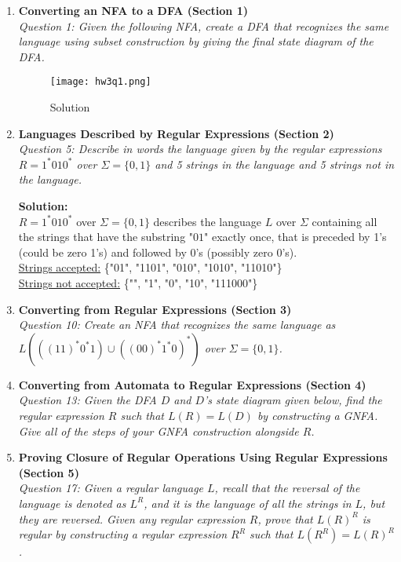 \documentclass[10pt,letterpaper,unboxed,cm]{article}
\begin{document}
\begin{enumerate}

\item \textbf{Converting an NFA to a DFA (Section 1)} \\
\emph{Question 1: Given the following NFA, create a DFA that recognizes the same language using subset construction by giving the final state diagram of the DFA.}

\begin{figure}[h]
    \centering
    \texttt{[image: hw3q1.png]}
    \caption{Solution}
    \label{fig:placeholder}
\end{figure}

\pagebreak 

\item \textbf{Languages Described by Regular Expressions (Section 2)} \\
\emph{Question 5: Describe in words the language given by the regular expressions $R=1^*010^*$ over $\Sigma = \{0,1\}$ and 5 strings in the language and 5 strings not in the language.}

\textbf{Solution:}
\\$R=1^*010^*$ over $\Sigma=\{0,1\}$ describes the language $L$ over $\Sigma$ containing all the strings that have the substring "$01$" exactly once, that is preceded by 1's (could be zero 1's) and followed by 0's (possibly zero 0's).
\\\underline{Strings accepted:} \{"01", "1101", "010", "1010", "11010"\}
\\\underline{Strings not accepted:} \{"", "1", "0", "10", "111000"\}

\pagebreak

\item \textbf{Converting from Regular Expressions (Section 3)} \\
\emph{Question 10: Create an NFA that recognizes the same language as $L(((11)^*0^*1)\cup((00)^*1^*0)^*)$ over $\Sigma=\{0,1\}$.}


\pagebreak 

\item \textbf{Converting from Automata to Regular Expressions (Section 4)} \\
\emph{Question 13: Given the DFA $D$ and $D$'s state diagram given below, find the regular expression $R$ such that $L(R)=L(D)$ by constructing a GNFA. Give all of the steps of your GNFA construction alongside $R$.}


\pagebreak

\item \textbf{Proving Closure of Regular Operations Using Regular Expressions (Section 5)} \\
\emph{Question 17: Given a regular language $L$, recall that the reversal of the language is denoted as $L^R$, and it is the language of all the strings in $L$, but they are reversed. Given any regular expression $R$, prove that $L(R)^R$ is regular by constructing a regular expression $R^R$ such that $L(R^R) = L(R)^R$.}


\end{enumerate}
\end{document}
